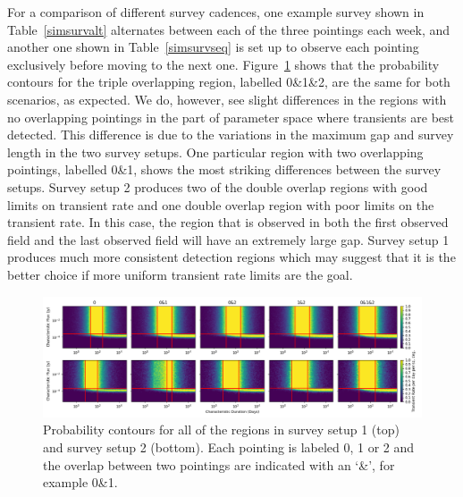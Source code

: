 \documentclass[12pt]{article}
\begin{document}
For a comparison of different survey cadences, one example survey shown in Table~\ref{simsurvalt} alternates between each of the three pointings each week, and another one shown in Table~\ref{simsurvseq} is set up to observe each pointing exclusively before moving to the next one. Figure~\ref{multirgnprob} shows that the probability contours for the triple overlapping region, labelled 0\&1\&2, are the same for both scenarios, as expected. We do, however, see slight differences in the regions with no overlapping pointings in the part of parameter space where transients are best detected. This difference is due to the variations in the maximum gap and survey length in the two survey setups. One particular region with two overlapping pointings, labelled 0\&1, shows the most striking differences between the survey setups. Survey setup 2 produces two of the double overlap regions with good limits on transient rate and one double overlap region with poor limits on the transient rate. In this case, the region that is observed in both the first observed field and the last observed field will have an extremely large gap. Survey setup 1 produces much more consistent detection regions which may suggest that it is the better choice if more uniform transient rate limits are the goal. 


 \begin{figure}
\includegraphics[width=\columnwidth]{multirgnprob.png}
\caption{Probability contours for all of the regions in survey setup 1 (top) and survey setup 2 (bottom). Each pointing is labeled 0, 1 or 2 and the overlap between two pointings are indicated with an `\&', for example 0\&1.}
\label{multirgnprob}
 \end{figure}

\clearpage
\end{document}
